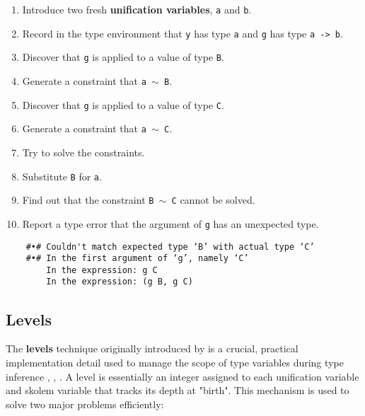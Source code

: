 \begin{enumerate}
    \item Introduce two fresh \textbf{unification variables}, \texttt{a} and \texttt{b}.
    \item Record in the type environment that \texttt{y} has type \texttt{a} and \texttt{g} has type \texttt{a -> b}.
    \item Discover that \texttt{g} is applied to a value of type \texttt{B}.
    \item Generate a constraint that \texttt{a $\sim$ B}.
    \item Discover that \texttt{g} is applied to a value of type \texttt{C}.
    \item Generate a constraint that \texttt{a $\sim$ C}.
    \item Try to solve the constraints.
    \item Substitute \texttt{B} for \texttt{a}.
    \item Find out that the constraint \texttt{B $\sim$ C} cannot be solved.
    \item Report a type error that the argument of \texttt{g} has an unexpected type.
\end{enumerate}

\begin{verbatim}
    #•# Couldn't match expected type ‘B’ with actual type ‘C’
    #•# In the first argument of ‘g’, namely ‘C’
        In the expression: g C
        In the expression: (g B, g C)
\end{verbatim}

\subsection{Levels}

The \textbf{levels} technique originally introduced by \citeauthor{remy-levels} \cite{remy-levels} is a crucial, practical implementation detail used to manage the scope of type variables during type inference \cite{practical-type-inference-with-levels-2025}, \cite{wits-type-inference-using-constraints}, \cite{levels-wits25-2025}. A level is essentially an integer assigned to each unification variable and skolem variable that tracks its depth at "birth". This mechanism is used to solve two major problems efficiently:

